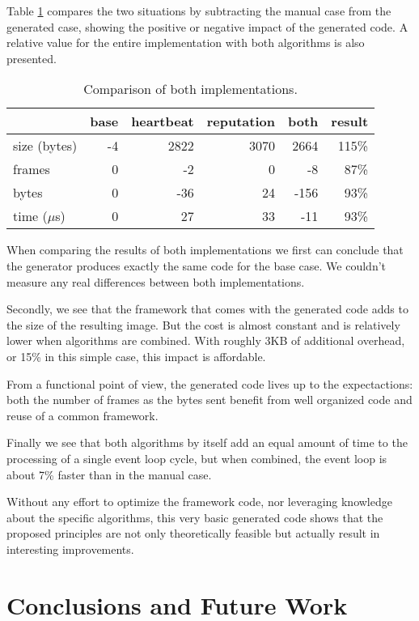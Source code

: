 \documentclass[conference]{IEEEtran}
\begin{document}
Table \ref{tbl:summary} compares the two situations by subtracting the manual
case from the generated case, showing the positive or negative impact of the
generated code. A relative value for the entire implementation with both
algorithms is also presented.

\begin{table}[H]
  \centering
  \begin{tabular}{lrrrrr}
  \hline
                & base & heartbeat & reputation & both  & result \\
  \hline
  size (bytes)  & -4    & 2822     & 3070       & 2664  & 115\%  \\
  frames        & 0     & -2       & 0          & -8    & 87\%   \\
  bytes         & 0     & -36      & 24         & -156  & 93\%   \\
  time ($\mu$s) & 0     & 27       & 33         & -11   & 93\%   \\
  \hline
  \end{tabular}
  \caption{Comparison of both implementations.}
  \label{tbl:summary}
\end{table}

When comparing the results of both implementations we first can conclude that
the generator produces exactly the same code for the base case. We couldn't
measure any real differences between both implementations.

Secondly, we see that the framework that comes with the generated code adds to
the size of the resulting image. But the cost is almost constant and is
relatively lower when algorithms are combined. With roughly 3KB of additional
overhead, or 15\% in this simple case, this impact is affordable.

From a functional point of view, the generated code lives up to the
expectactions: both the number of frames as the bytes sent benefit from well
organized code and reuse of a common framework.

Finally we see that both algorithms by itself add an equal amount of time to
the processing of a single event loop cycle, but when combined, the event loop
is about 7\% faster than in the manual case.

Without any effort to optimize the framework code, nor leveraging knowledge
about the specific algorithms, this very basic generated code shows that the
proposed principles are not only theoretically feasible but actually result in
interesting improvements.

\section{Conclusions and Future Work}
\label{section:conclusions}
\end{document}
